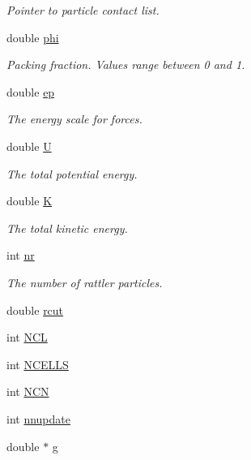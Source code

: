 \begin{DoxyCompactItemize}
\begin{DoxyCompactList}\small\item\em Pointer to particle contact list. \end{DoxyCompactList}\item 
double \mbox{\hyperlink{classpacking_a951a89b6ca12a40cb60344752bd8d817}{phi}}
\begin{DoxyCompactList}\small\item\em Packing fraction. Values range between 0 and 1. \end{DoxyCompactList}\item 
double \mbox{\hyperlink{classpacking_a1c04efa5180dbc7100daa11b1b0728f7}{ep}}
\begin{DoxyCompactList}\small\item\em The energy scale for forces. \end{DoxyCompactList}\item 
double \mbox{\hyperlink{classpacking_a4412ad37535700fcf62fb9e3d87c2c49}{U}}
\begin{DoxyCompactList}\small\item\em The total potential energy. \end{DoxyCompactList}\item 
double \mbox{\hyperlink{classpacking_acf38ce991d03baddda7344ec7e979f6c}{K}}
\begin{DoxyCompactList}\small\item\em The total kinetic energy. \end{DoxyCompactList}\item 
int \mbox{\hyperlink{classpacking_a31eede3d604c45fef6021170ee506c77}{nr}}
\begin{DoxyCompactList}\small\item\em The number of rattler particles. \end{DoxyCompactList}\item 
double \mbox{\hyperlink{classpacking_aefd159c50069573f1f2a3a6f0ff50984}{rcut}}
\item 
int \mbox{\hyperlink{classpacking_a9a8d986ed98d37a87ea3f3785c0ffe61}{N\+CL}}
\item 
int \mbox{\hyperlink{classpacking_a212d4cc14a81cd3bb06ec7cbb5b74567}{N\+C\+E\+L\+LS}}
\item 
int \mbox{\hyperlink{classpacking_a4e173c52dc54a01ee8a8c42a0afd473f}{N\+CN}}
\item 
int \mbox{\hyperlink{classpacking_aae18c45219be166f5f1e44ab838f2252}{nnupdate}}
\item 
double $\ast$ \mbox{\hyperlink{classpacking_abe2f507633454e3d2d8fd42161bcae09}{g}}

\end{DoxyCompactItemize}
